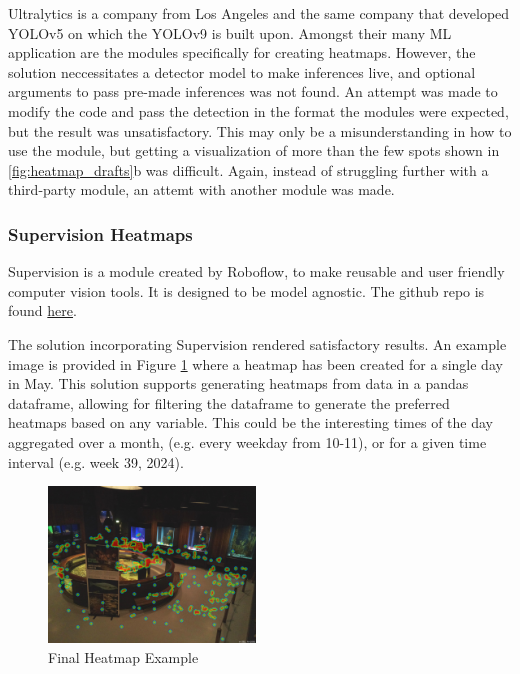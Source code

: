 Ultralytics is a company from Los Angeles and the same company that developed YOLOv5 on which the YOLOv9 is built upon. Amongst their many ML application are the modules specifically for creating heatmaps. However, the solution neccessitates a detector model to make inferences live, and optional arguments to pass pre-made inferences was not found. An attempt was made to modify the code and pass the detection in the format the modules were expected, but the result was unsatisfactory. This may only be a misunderstanding in how to use the module, but getting a visualization of more than the few spots shown in \ref{fig:heatmap_drafts}b was difficult. Again, instead of struggling further with a third-party module, an attemt with another module was made.

\subsubsection{Supervision Heatmaps}
Supervision is a module created by Roboflow, to make reusable and user friendly computer vision tools. It is designed to be model agnostic. The github repo is found \href{https://github.com/roboflow/supervision}{here}.

The solution incorporating Supervision rendered satisfactory results. An example image is provided in Figure \ref{fig:heatmap_final_example} where a heatmap has been created for a single day in May. This solution supports generating heatmaps from data in a pandas dataframe, allowing for filtering the dataframe to generate the preferred heatmaps based on any variable. This could be the interesting times of the day aggregated over a month, (e.g. every weekday from 10-11), or for a given time interval (e.g. week 39, 2024).

\begin{figure}[H]
    \centering
    \includegraphics[width=0.49\textwidth]{Images/Analytics/heatmap_day_10052024.jpg}
    \caption{Final Heatmap Example}
    \label{fig:heatmap_final_example}
\end{figure}
